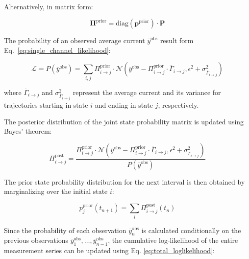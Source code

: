 \documentclass[pdflatex,sn-mathphys-num]{sn-jnl}%
\theoremstyle{thmstyleone}%
\theoremstyle{thmstyletwo}%
\theoremstyle{thmstylethree}%
\begin{document}
Alternatively, in matrix form:

\begin{equation}
	\boldsymbol{\Pi}^{\text{prior}} = \mathrm{diag}(\boldsymbol{p}^{\text{prior}}) \cdot \mathbf{P}
	\label{eq:joint_state_probability_matrix}
\end{equation}

The probability of an observed average current \( \overline{y}^{\text{obs}} \) result form Eq.~\ref{eq:single_channel_likelihood}:

\begin{equation}
	\mathcal{L}=P(\overline{y}^{\text{obs}}) = \sum_{i, j} \Pi_{i \rightarrow j}^{\text{prior}} \cdot \mathcal{N}\left(\overline{y}^{\text{obs}} - \Pi_{i \rightarrow j}^{\text{prior}} \cdot \overline{\Gamma}_{i \rightarrow j}, \epsilon^2 + \sigma^2_{\overline{\Gamma}_{i \rightarrow j}}\right)
	\label{eq:single_channel_integrated_likelihood}
\end{equation}

where \( \overline{\Gamma}_{i \rightarrow j} \) and \( \sigma^2_{\overline{\Gamma}_{i \rightarrow j}} \) represent the average current and its variance for trajectories starting in state \( i \) and ending in state \( j \), respectively.

The posterior distribution of the joint state probability matrix is updated using Bayes' theorem:

\begin{equation}
	\Pi_{i \rightarrow j}^{\text{post}} = \frac{\Pi_{i \rightarrow j}^{\text{prior}} \cdot \mathcal{N}\left(\overline{y}^{\text{obs}} - \Pi_{i \rightarrow j}^{\text{prior}} \cdot \overline{\Gamma}_{i \rightarrow j}, \epsilon^2 + \sigma^2_{\overline{\Gamma}_{i \rightarrow j}}\right)}{P(\overline{y}^{\text{obs}})}
	\label{eq:single_channel_integrated_posterior}
\end{equation}

The prior state probability distribution for the next interval is then obtained by marginalizing over the initial state \( i \):

\begin{equation}
	p_j^{\text{prior}}(t_{n+1}) = \sum_i \Pi_{i \rightarrow j}^{\text{post}}(t_n)
	\label{eq:single_channel_integrated_next_prior}
\end{equation}

Since the probability of each observation \( \overline{y}_n^{\text{obs}} \) is calculated conditionally on the previous observations \( \overline{y}_1^{\text{obs}}, \dots, \overline{y}_{n-1}^{\text{obs}} \), the cumulative log-likelihood of the entire measurement series can be updated using Eq. \ref{eq:total_loglikelihood}:
\end{document}
